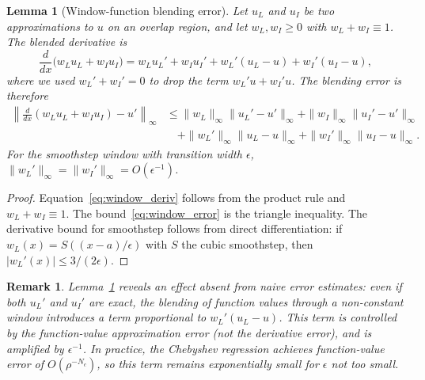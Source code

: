 \documentclass[sn-mathphys,Numbered]{sn-jnl}
\theoremstyle{thmstyleone}
\newtheorem{lemma}[theorem]{Lemma}
\theoremstyle{thmstyletwo}
\newtheorem{remark}{Remark}
\theoremstyle{thmstylethree}
\begin{document}
\begin{lemma}[Window-function blending error]\label{lem:window}
Let $u_L$ and $u_I$ be two approximations to $u$ on an overlap region, and let $w_L,w_I\geq 0$ with $w_L+w_I\equiv 1$. The blended derivative is
\begin{equation}
    \frac{d}{dx}\bigl(w_L u_L + w_I u_I\bigr)
    = w_L u_L' + w_I u_I' + w_L'(u_L-u) + w_I'(u_I-u),
    \label{eq:window_deriv}
\end{equation}
where we used $w_L'+w_I'=0$ to drop the term $w_L'u+w_I'u$. The blending error is therefore
\begin{align}
    \left\|\frac{d}{dx}(w_L u_L+w_I u_I)-u'\right\|_\infty
    &\leq \|w_L\|_\infty\|u_L'-u'\|_\infty + \|w_I\|_\infty\|u_I'-u'\|_\infty \nonumber \\
    &\quad + \|w_L'\|_\infty\|u_L-u\|_\infty + \|w_I'\|_\infty\|u_I-u\|_\infty.
    \label{eq:window_error}
\end{align}
For the smoothstep window with transition width $\epsilon$, $\|w_L'\|_\infty=\|w_I'\|_\infty=O(\epsilon^{-1})$.
\end{lemma}
\begin{proof}
Equation~\eqref{eq:window_deriv} follows from the product rule and $w_L+w_I\equiv 1$. The bound~\eqref{eq:window_error} is the triangle inequality. The derivative bound for smoothstep follows from direct differentiation: if $w_L(x)=S((x-a)/\epsilon)$ with $S$ the cubic smoothstep, then $|w_L'(x)|\leq 3/(2\epsilon)$.
\end{proof}

\begin{remark}
Lemma~\ref{lem:window} reveals an effect absent from naive error estimates: even if both $u_L'$ and $u_I'$ are exact, the blending of \emph{function values} through a non-constant window introduces a term proportional to $w_L'(u_L-u)$. This term is controlled by the function-value approximation error (not the derivative error), and is amplified by $\epsilon^{-1}$. In practice, the Chebyshev regression achieves function-value error of $O(\rho^{-N_c})$, so this term remains exponentially small for $\epsilon$ not too small.
\end{remark}
\end{document}
